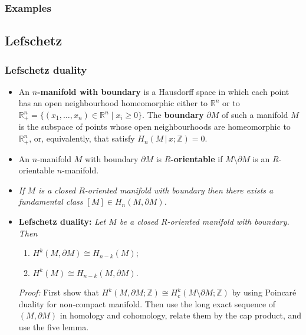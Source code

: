\documentclass[10pt]{article}
\newcommand{\rr}{\mathbb{R}}
\newcommand{\zz}{\mathbb{Z}}
\newcommand{\vbar}{\,|\,}
\begin{document}
            \subsubsection{Examples}


        \subsection{Lefschetz}

            \subsubsection{Lefschetz duality}

            \begin{itemize}
                \item An \textbf{$n$-manifold with boundary} is a Hausdorff space in which each point has an open neighbourhood homeomorphic either to $\rr^n$ or to $\rr^n_+=\{(x_1,\ldots,x_n)\in\rr^n\mid x_i\geqslant0\}$.
                    The \textbf{boundary} $\partial M$ of such a manifold $M$ is the subspace of points whose open neighbourhoods are homeomorphic to $\rr^n_+$, or, equivalently, that satisfy \mbox{$H_n(M\vbar x;\zz)=0$}.
                \item An $n$-manifold $M$ with boundary $\partial M$ is \textbf{$R$-orientable} if $M\setminus\partial M$ is an $R$-orientable $n$-manifold.
                \item \emph{If $M$ is a closed $R$-oriented manifold with boundary then there exists a fundamental class $[M]\in H_n(M,\partial M)$.}
                \item \textbf{Lefschetz duality:} \emph{Let $M$ be a closed $R$-oriented manifold with boundary. Then}
                    \begin{enumerate}
                        \item $H^k(M,\partial M)\cong H_{n-k}(M)$;
                        \item $H^k(M)\cong H_{n-k}(M,\partial M)$.
                    \end{enumerate}

                    \emph{Proof:} First show that $H^k(M,\partial M;\zz)\cong H^k_c(M\setminus\partial M;\zz)$ by using Poincaré duality for non-compact manifold.
                        Then use the long exact sequence of $(M,\partial M)$ in homology and cohomology, relate them by the cap product, and use the five lemma.
            \end{itemize}
\end{document}
